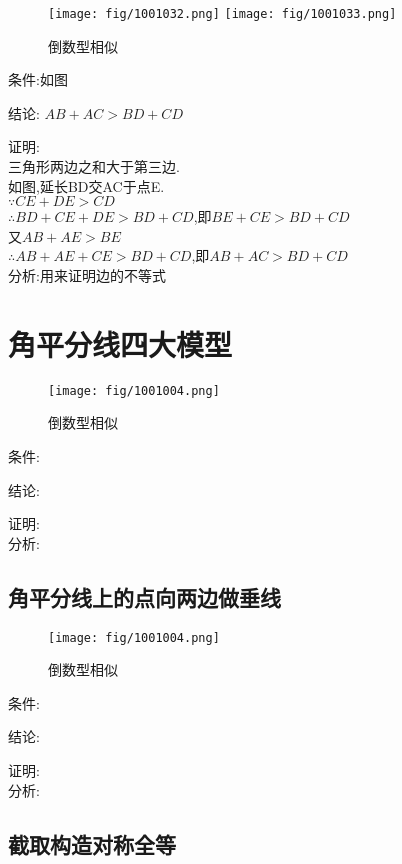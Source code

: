 \documentclass[cn,blue,10pt]{elegantbook}
\begin{document}
\begin{figure}[h]
    \centering
    \texttt{[image: fig/1001032.png]}
    \texttt{[image: fig/1001033.png]}
    \caption{倒数型相似}%
    \label{fig:倒数型相似}
\end{figure}
条件:如图 

结论: \(AB+AC>BD+CD\) 

证明:\\
三角形两边之和大于第三边.\\
如图,延长BD交AC于点E.\\
\(\because CE+DE>CD\)\\
\(\therefore BD+CE+DE>BD+CD\),即\(BE+CE>BD+CD\)\\
又\(AB+AE>BE\)\\
\(\therefore AB+AE+CE>BD+CD\),即\(AB+AC>BD+CD\)\\

分析:用来证明边的不等式 


\section{角平分线四大模型}%
\label{sec:角平分线四大模型}

\begin{figure}[h]
    \centering
    \texttt{[image: fig/1001004.png]}
    \caption{倒数型相似}%
    \label{fig:倒数型相似}
\end{figure}
条件: \(\) 

结论: \( \) 

证明:\\

分析: 
\subsection{角平分线上的点向两边做垂线}%
\label{sub:角平分线上的点向两边做垂线}

\begin{figure}[h]
    \centering
    \texttt{[image: fig/1001004.png]}
    \caption{倒数型相似}%
    \label{fig:倒数型相似}
\end{figure}
条件: \(\) 

结论: \( \) 

证明:\\

分析: 

\subsection{截取构造对称全等}%
\label{sub:截取构造对称全等}
\end{document}
